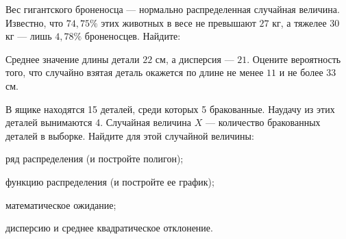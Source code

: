 \vfil

\begin{zkrPlain}{25}\noindent 
	Вес гигантского броненосца — нормально распределенная случайная величина. Известно, что $74{,}75\%$ этих животных в весе не превышают $27$ кг, а тяжелее $30$ кг — лишь $4{,}78\%$ броненосцев. Найдите: \par {}
 
\end{zkrPlain}

\vfil

\begin{zkrPlain}{25}\noindent 
	Среднее значение длины детали $ 22 $ см, а дисперсия --- $ 21 $. Оцените вероятность того, что случайно взятая деталь окажется по длине не менее $ 11 $ и не более $ 33 $ см.
 
\end{zkrPlain}

\newpage\setcounter{zad}{0}\setcounter{footnote}{0}



\begin{zkrPlain}{25}\noindent 
	В ящике находятся 15 деталей, среди которых 5 бракованные. Наудачу из этих деталей вынимаются 4. Случайная величина $X$ --- количество бракованных деталей в выборке.  Найдите для этой случайной величины: \par \smallskip\small{ \par \zz ряд распределения (и постройте полигон); \par \zz функцию распределения (и постройте ее график); \par \zz математическое ожидание; \par \zz дисперсию и среднее квадратическое отклонение.\par \par}
 
\end{zkrPlain}

\vfil

